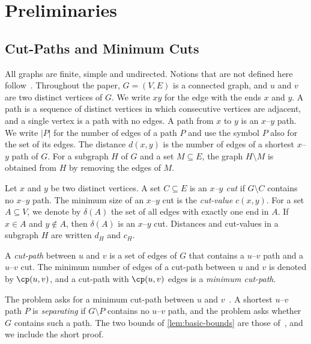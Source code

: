 
\section{Preliminaries}
\label{sec:preliminaries}

\subsection{Cut-Paths and Minimum Cuts}
\label{sec:cut-paths}

All graphs are finite, simple and undirected.
Notions that are not defined here follow~\cite{Diestel2025}.
Throughout the paper, $G = (V, E)$ is a connected graph, and $u$ and $v$ are two distinct vertices of $G$.
We write $xy$ for the edge with the ends $x$ and $y$.
A path is a sequence of distinct vertices in which consecutive vertices are adjacent, and a single vertex is a path with no edges.
A path from $x$ to $y$ is an $x$--$y$ path.
We write $|P|$ for the number of edges of a path $P$ and use the symbol $P$ also for the set of its edges.
The distance $d(x, y)$ is the number of edges of a shortest $x$--$y$ path of $G$.
For a subgraph $H$ of $G$ and a set $M \subseteq E$, the graph $H \setminus M$ is obtained from $H$ by removing the edges of $M$.

Let $x$ and $y$ be two distinct vertices.
A set $C \subseteq E$ is an \emph{$x$--$y$ cut} if $G \setminus C$ contains no $x$--$y$ path.
The minimum size of an $x$--$y$ cut is the \emph{cut-value} $c(x, y)$.
For a set $A \subseteq V$, we denote by $\delta(A)$ the set of all edges with exactly one end in $A$.
If $x \in A$ and $y \notin A$, then $\delta(A)$ is an $x$--$y$ cut.
Distances and cut-values in a subgraph $H$ are written $d_H$ and $c_H$.

\begin{definition}
\label{def:cut-path}
A \emph{cut-path} between $u$ and $v$ is a set of edges of $G$ that contains a $u$--$v$ path and a $u$--$v$ cut.
The minimum number of edges of a cut-path between $u$ and $v$ is denoted by $\cp(u, v)$, and a cut-path with $\cp(u, v)$ edges is a \emph{minimum cut-path}.
\end{definition}

The \MinCutPath{} problem asks for a minimum cut-path between $u$ and $v$~\cite{Michel2025MinCutPath}.
A shortest $u$--$v$ path $P$ is \emph{separating} if $G \setminus P$ contains no $u$--$v$ path, and the \SSP{} problem asks whether $G$ contains such a path.
The two bounds of \cref{lem:basic-bounds} are those of~\cite[Claim~7]{Michel2025MinCutPath}, and we include the short proof.

